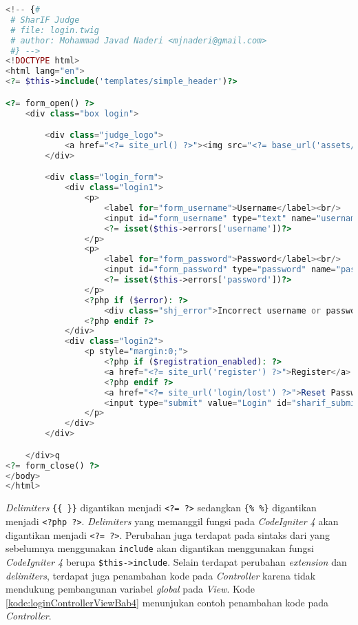 \begin{lstlisting}[language=PHP, caption=Perubahan \textit{view} pada \textit{Login.php}, label=kode:loginViewBab4]
<!-- {#
 # SharIF Judge
 # file: login.twig
 # author: Mohammad Javad Naderi <mjnaderi@gmail.com>
 #} -->
<!DOCTYPE html>
<html lang="en">
<?= $this->include('templates/simple_header')?>

<?= form_open() ?>
	<div class="box login">

		<div class="judge_logo">
			<a href="<?= site_url() ?>"><img src="<?= base_url('assets/images/banner.png') ?>"/></a>
		</div>

		<div class="login_form">
			<div class="login1">
				<p>
					<label for="form_username">Username</label><br/>
					<input id="form_username" type="text" name="username" required="required" pattern="[0-9a-z]{3,20}" title="The Username field must be between 3 and 20 characters in length, and contain only digits and lowercase letters" class="sharif_input" value="<?= set_value('username') ?>" autofocus="autofocus"/>
					<?= isset($this->errors['username'])?>
				</p>
				<p>
					<label for="form_password">Password</label><br/>
					<input id="form_password" type="password" name="password" required="required" pattern=".{6,200}" title="The Password field must be at least 6 characters in length" class="sharif_input"/>
					<?= isset($this->errors['password'])?>
				</p>
				<?php if ($error): ?>
					<div class="shj_error">Incorrect username or password.</div>
				<?php endif ?>
			</div>
			<div class="login2">
				<p style="margin:0;">
					<?php if ($registration_enabled): ?>
					<a href="<?= site_url('register') ?>">Register</a> |
					<?php endif ?>
					<a href="<?= site_url('login/lost') ?>">Reset Password</a>
					<input type="submit" value="Login" id="sharif_submit"/>
				</p>
			</div>
		</div>

	</div>q
<?= form_close() ?>
</body>
</html>
\end{lstlisting}

\textit{Delimiters} \verb|{{ }}| digantikan menjadi \texttt{<?= ?>} sedangkan \verb|{% %}| digantikan menjadi \texttt{<?php ?>}. \textit{Delimiters} yang memanggil fungsi pada \textit{CodeIgniter 4} akan digantikan menjadi \texttt{<?= ?>}. Perubahan juga terdapat pada sintaks dari yang sebelumnya menggunakan \texttt{include} akan digantikan menggunakan fungsi \textit{CodeIgniter 4} berupa \verb|$this->include|. Selain terdapat perubahan \textit{extension} dan \textit{delimiters}, terdapat juga penambahan kode pada \textit{Controller} karena tidak mendukung pembangunan variabel \textit{global} pada \textit{View}. Kode \ref{kode:loginControllerViewBab4} menunjukan contoh penambahan kode pada \textit{Controller}.

